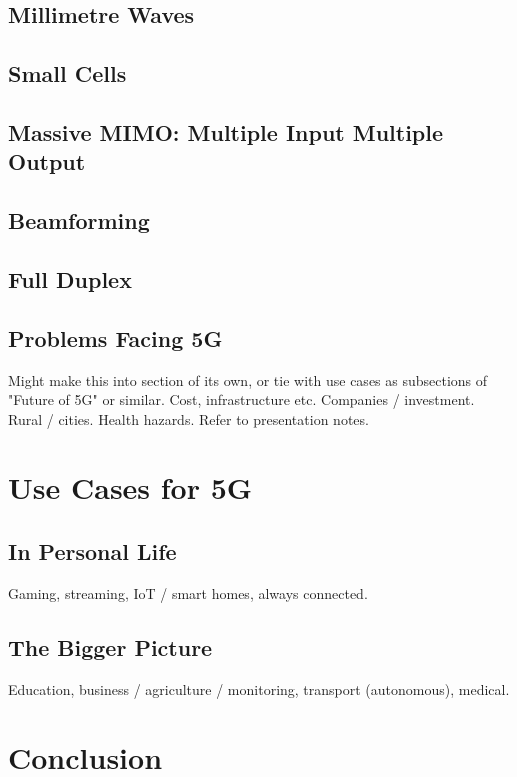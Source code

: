 \documentclass[journal]{IEEEtran}
\begin{document}
\subsection{Millimetre Waves}
\subsection{Small Cells}
\subsection{Massive MIMO: Multiple Input Multiple Output}
\subsection{Beamforming}
\subsection{Full Duplex}
\subsection{Problems Facing 5G}
Might make this into section of its own, or tie with use cases as subsections of "Future of 5G" or similar.
Cost, infrastructure etc. Companies / investment. Rural / cities. Health hazards. Refer to presentation notes.

\section{Use Cases for 5G}
\subsection{In Personal Life}
Gaming, streaming, IoT / smart homes, always connected.
\subsection{The Bigger Picture}
Education, business / agriculture / monitoring, transport (autonomous), medical.

\section{Conclusion}

\printbibliography
\end{document}
